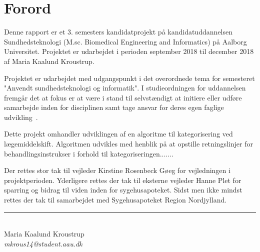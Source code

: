 \chapter*{Forord}
Denne rapport er et 3. semesters kandidatprojekt på kandidatuddannelsen Sundhedsteknologi (M.sc. Biomedical Engineering and Informatics) på Aalborg Universitet. Projektet er udarbejdet i perioden september 2018 til december 2018 af Maria Kaalund Kroustrup. 

Projektet er udarbejdet med udgangspunkt i det overordnede tema for semesteret "Anvendt sundhedsteknologi og informatik". I studieordningen for uddannelsen fremgår det at fokus er at være i stand til selvstændigt at initiere eller udføre samarbejde inden for disciplinen samt tage ansvar for deres egen faglige udvikling~\citep{Studieordning2011}. 

Dette projekt omhandler udviklingen af en algoritme til kategorisering ved lægemiddelskift. Algoritmen udvikles med henblik på at opstille retningslinjer for behandlingsinstrukser i forhold til kategoriseringen.......


Der rettes stor tak til vejleder Kirstine Rosenbeck Gøeg for vejledningen i projektperioden. Yderligere rettes der tak til eksterne vejleder Hanne Plet for sparring og bidrag til viden inden for sygehusapoteket. Sidst men ikke mindst rettes der tak til samarbejdet med Sygehusapoteket Region Nordjylland. 

\vspace{1.5cm}
\begin{center}
\rule{6cm}{0.4pt} \\
Maria Kaalund Kroustrup \\
\textit{mkrous14@student.aau.dk}
\end{center}